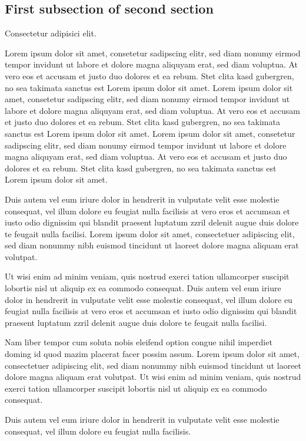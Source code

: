 \subsection{First subsection of second section}

Consectetur adipisici elit.

Lorem ipsum dolor sit amet, consetetur sadipscing elitr, sed diam nonumy eirmod tempor invidunt ut labore et dolore
magna aliquyam erat, sed diam voluptua. At vero eos et accusam et justo duo dolores et ea rebum. Stet clita kasd
gubergren, no sea takimata sanctus est Lorem ipsum dolor sit amet. Lorem ipsum dolor sit amet, consetetur sadipscing
elitr, sed diam nonumy eirmod tempor invidunt ut labore et dolore magna aliquyam erat, sed diam voluptua. At vero eos
et accusam et justo duo dolores et ea rebum. Stet clita kasd gubergren, no sea takimata sanctus est Lorem ipsum dolor
sit amet. Lorem ipsum dolor sit amet, consetetur sadipscing elitr, sed diam nonumy eirmod tempor invidunt ut labore
et dolore magna aliquyam erat, sed diam voluptua. At vero eos et accusam et justo duo dolores et ea rebum. Stet clita
kasd gubergren, no sea takimata sanctus est Lorem ipsum dolor sit amet.

Duis autem vel eum iriure dolor in hendrerit in vulputate velit esse molestie consequat, vel illum dolore eu feugiat
nulla facilisis at vero eros et accumsan et iusto odio dignissim qui blandit praesent luptatum zzril delenit augue
duis dolore te feugait nulla facilisi. Lorem ipsum dolor sit amet, consectetuer adipiscing elit, sed diam nonummy
nibh euismod tincidunt ut laoreet dolore magna aliquam erat volutpat.

Ut wisi enim ad minim veniam, quis nostrud exerci tation ullamcorper suscipit lobortis nisl ut aliquip ex ea commodo
consequat. Duis autem vel eum iriure dolor in hendrerit in vulputate velit esse molestie consequat, vel illum dolore
eu feugiat nulla facilisis at vero eros et accumsan et iusto odio dignissim qui blandit praesent luptatum zzril
delenit augue duis dolore te feugait nulla facilisi.

Nam liber tempor cum soluta nobis eleifend option congue nihil imperdiet doming id quod mazim placerat facer possim
assum. Lorem ipsum dolor sit amet, consectetuer adipiscing elit, sed diam nonummy nibh euismod tincidunt ut laoreet
dolore magna aliquam erat volutpat. Ut wisi enim ad minim veniam, quis nostrud exerci tation ullamcorper suscipit
lobortis nisl ut aliquip ex ea commodo consequat.

Duis autem vel eum iriure dolor in hendrerit in vulputate velit esse molestie consequat, vel illum dolore eu feugiat
nulla facilisis.

